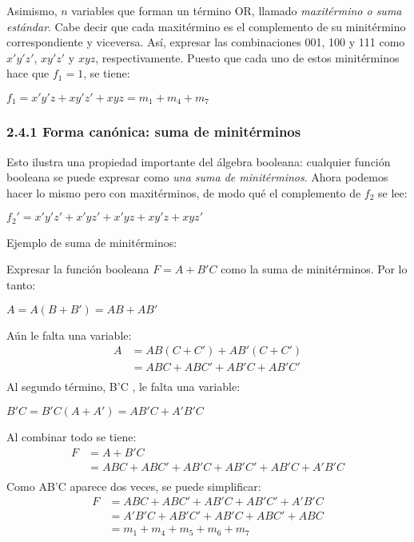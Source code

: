 Asimismo, $n$ variables que forman un t\'{e}rmino OR, llamado
\textit{maxit\'{e}rmino o suma est\'{a}ndar}. Cabe decir que cada
maxit\'{e}rmino es el complemento de su minit\'{e}rmino correspondiente y
viceversa. As\'{i}, expresar las combinaciones 001, 100 y 111 como $x'y'z'$,
$xy'z'$ y $xyz$, respectivamente. Puesto que cada uno de estos minit\'{e}rminos
hace que $f_1 = 1$, se tiene:
\begin{center}
    $f_1 = x'y'z + xy'z' + xyz = m_1 + m_4 + m_7$
\end{center}

\subsubsection*{2.4.1 Forma can\'{o}nica: suma de minit\'{e}rminos}
\begin{flushleft}
    Esto ilustra una propiedad importante del \'{a}lgebra booleana:
    cualquier funci\'{o}n booleana se puede expresar como \textit{una suma de
    minit\'{e}rminos}. Ahora podemos hacer lo mismo pero con maxit\'{e}rminos, de
    modo qu\'{e} el complemento de $f_2$ se lee:
\end{flushleft}
\begin{center}
    $f_2' = x'y'z' +x'yz' + x'yz + xy'z + xyz'$
\end{center}

Ejemplo de suma de minit\'{e}rminos:
\begin{flushleft}
    Expresar la funci\'{o}n booleana $F = A + B'C$ como la suma de minit\'{e}rminos. Por lo tanto:
    \begin{center}
        $A = A(B + B') = AB + AB'$
    \end{center}
    A\'{u}n le falta una variable:
    \begin{align*}
        A & = AB(C + C') + AB'(C + C')  \\
          & = ABC + ABC' + AB'C + AB'C' \\
    \end{align*}
    Al segundo t\'{e}rmino, B'C , le falta una variable:
    \begin{center}
        $B'C = B'C(A + A') = AB'C + A'B'C$
    \end{center}
    Al combinar todo se tiene:
    \begin{align*} F & = A + B'C                                  \\
                 & = ABC + ABC' + AB'C + AB'C' + AB'C + A'B'C \\
    \end{align*}
    Como AB'C aparece dos veces, se puede simplificar:
    \begin{align*}
        F & = ABC + ABC' + AB'C + AB'C' + A'B'C  \\
          & = A'B'C + AB'C' + AB'C  + ABC' + ABC \\
          & = m_1 + m_4 + m_5 + m_6 + m_7
    \end{align*}
\end{flushleft}

